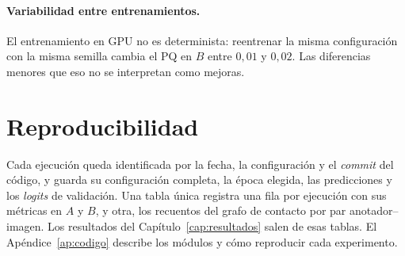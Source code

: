 \paragraph{Variabilidad entre entrenamientos.} El entrenamiento en GPU
no es determinista: reentrenar la misma configuración con la misma
semilla cambia el PQ en $B$ entre $0{,}01$ y $0{,}02$. Las diferencias
menores que eso no se interpretan como mejoras.

\section{Reproducibilidad}
\label{sec:reproducibilidad}

Cada ejecución queda identificada por la fecha, la configuración y el
\emph{commit} del código, y guarda su configuración completa, la época
elegida, las predicciones y los \emph{logits} de validación. Una tabla
única registra una fila por ejecución con sus métricas en $A$ y $B$, y
otra, los recuentos del grafo de contacto por par anotador--imagen. Los
resultados del Capítulo~\ref{cap:resultados} salen de esas tablas. El
Apéndice~\ref{ap:codigo} describe los módulos y cómo reproducir cada
experimento.
